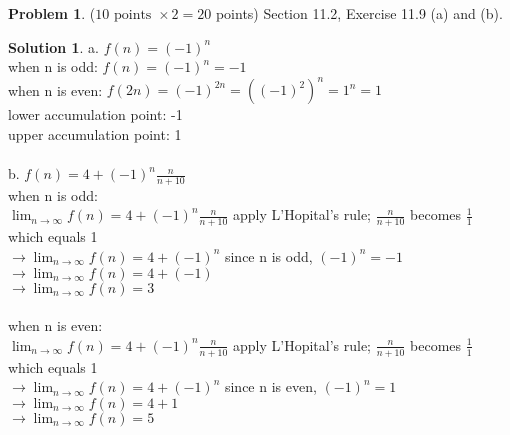 \documentclass{article}
\theoremstyle{definition}
\newtheorem{problem}{Problem}
\newtheorem*{solution}{Solution}
\begin{document}
\begin{problem} ($10 \text{ points } \times 2 = 20$ points) Section 11.2, Exercise 11.9 (a) and (b).
\end{problem}
\begin{solution} 
a. $f(n) = (-1)^n$ \\
when n is odd: $f(n) = (-1)^n = -1$ \\
when n is even: $f(2n) = (-1)^{2n} = ((-1)^2)^n = 1^n = 1$ \\
lower accumulation point: -1 \\
upper accumulation point: 1 \\
\\
b. $f(n) = 4 + (-1)^n \frac{n}{n + 10}$ \\
when n is odd: \\
$\lim_{n\to\infty} f(n) = 4 + (-1)^n \frac{n}{n + 10}$ apply L'Hopital's rule; $\frac{n}{n + 10}$ becomes $\frac{1}{1}$ which equals 1 \\
$\to \lim_{n\to\infty} f(n) = 4 + (-1)^n$ since n is odd, $(-1)^n = -1$ \\
$\to \lim_{n\to\infty} f(n) = 4 + (-1)$ \\
$\to \lim_{n\to\infty} f(n) = 3$ \\
\\
when n is even: \\
$\lim_{n\to\infty} f(n) = 4 + (-1)^n \frac{n}{n + 10}$ apply L'Hopital's rule; $\frac{n}{n + 10}$ becomes $\frac{1}{1}$ which equals 1 \\
$\to \lim_{n\to\infty} f(n) = 4 + (-1)^n$ since n is even, $(-1)^n = 1$ \\
$\to \lim_{n\to\infty} f(n) = 4 + 1$ \\
$\to \lim_{n\to\infty} f(n) = 5$ \\
\\

\end{solution}
\end{document}

